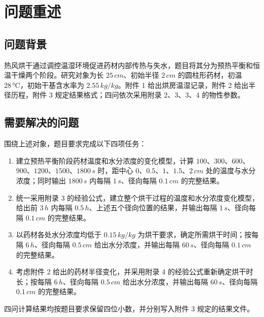 \documentclass[withoutpreface,bwprint]{cumcmthesis}
\title{\titleemphasis{药材烘干过程的传热传质建模}}
\begin{document}
\maketitle
\begin{abstract}
\end{abstract}

\section{问题重述}

\subsection{问题背景}

热风烘干通过调控温湿环境促进药材内部传热与失水，题目将其分为预热平衡和恒温干燥两个阶段。研究对象为长 $25\,\si{cm}$、初始半径 $2\,\si{cm}$ 的圆柱形药材，初温 $28\,\si{\celsius}$，初始干基含水率为 $2.55\,\si{kg/kg}$。附件 1 给出烘房温湿记录，附件 2 给出半径历程，附件 3 规定结果格式；四问依次采用附录 2、3、3、4 的物性参数。

\subsection{需要解决的问题}

围绕上述对象，题目要求完成以下四项任务：
\begin{enumerate}
  \item 建立预热平衡阶段药材温度和水分浓度的变化模型，计算 $100$、$300$、$600$、$900$、$1200$、$1500$、$1800\,\si{s}$ 时，距中心 $0$、$0.5$、$1$、$1.5$、$2\,\si{cm}$ 处的温度与水分浓度；同时输出 $1800\,\si{s}$ 内每隔 $1\,\si{s}$、径向每隔 $0.1\,\si{cm}$ 的完整结果。
  \item 统一采用附录 3 的经验公式，建立整个烘干过程的温度和水分浓度变化模型，给出前 $3\,\si{h}$ 内每隔 $0.5\,\si{h}$、上述五个径向位置的结果，并输出每隔 $1\,\si{s}$、径向每隔 $0.1\,\si{cm}$ 的完整结果。
  \item 以药材各处水分浓度均低于 $0.15\,\si{kg/kg}$ 为烘干要求，确定所需烘干时间；按每隔 $6\,\si{h}$、径向每隔 $0.5\,\si{cm}$ 给出水分浓度，并输出每隔 $60\,\si{s}$、径向每隔 $0.1\,\si{cm}$ 的完整结果。
  \item 考虑附件 2 给出的药材半径变化，并采用附录 4 的经验公式重新确定烘干时长；按每隔 $6\,\si{h}$、径向每隔 $0.5\,\si{cm}$ 给出水分浓度，并输出每隔 $60\,\si{s}$、径向每隔 $0.1\,\si{cm}$ 的完整结果。
\end{enumerate}
四问计算结果均按题目要求保留四位小数，并分别写入附件 3 规定的结果文件。
\end{document}
